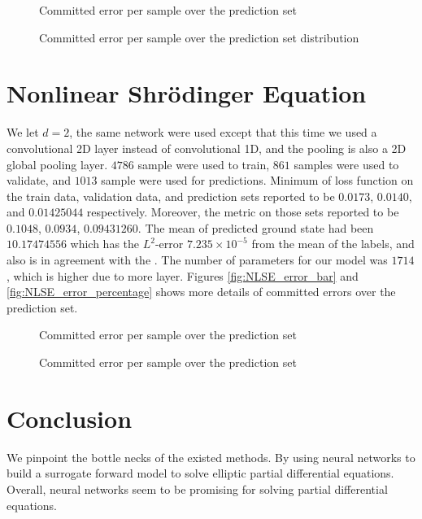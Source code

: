 \begin{figure}[h!]
	{
		\centering
		\def\svgwidth{\columnwidth}
		\scalebox{.5}{}
		\caption{Committed error per sample over the prediction set}
		\label{fig:ECIM_error_bar}
	}
\end{figure}

\begin{figure}[h!]
	{
		\centering
		\def\svgwidth{\columnwidth}
		\scalebox{.5}{}
		\caption{Committed error per sample over the prediction set distribution}
		\label{fig:ECIM_error_percentage}
	}
\end{figure}
\section{Nonlinear Shr\"{o}dinger Equation}
We let $d=2$, the same network were used except that this time we used a convolutional 2D layer instead of convolutional 1D, and the pooling is also a 2D global pooling layer. $4786$ sample were used to train, $861$ samples were used to validate, and $1013$ sample were used for predictions. Minimum of loss function on the train data, validation data, and prediction sets reported to be $0.0173$, $0.0140$, and $0.01425044$ respectively. Moreover, the metric on those sets reported to be  $0.1048$, $0.0934$, $0.09431260$. The mean of predicted ground state had been $10.17474556$ which has the $L^2$-error $7.235 \times 10^{-5}$ from the mean of the labels, and also is in agreement with the \cite{Base_paper}. The number of parameters for our model was $1714$, which is higher due to more layer. Figures \eqref{fig:NLSE_error_bar} and \eqref{fig:NLSE_error_percentage} shows more details of committed errors over the prediction set. 
\begin{figure}[h!]
	{
		\centering
		\def\svgwidth{\columnwidth}
		\scalebox{.5}{}
		\caption{Committed error per sample over the prediction set}
		\label{fig:NLSE_error_bar}
	}
\end{figure}

\begin{figure}[h!]
	{
		\centering
		\def\svgwidth{\columnwidth}
		\scalebox{.5}{}
		\caption{Committed error per sample over the prediction set}
		\label{fig:NLSE_error_percentage}
	}
\end{figure}

\section{Conclusion}
We pinpoint the bottle necks of the existed methods. By using neural networks to build a surrogate forward model to solve elliptic partial differential equations.
Overall, neural networks seem to be promising for solving partial differential equations.

